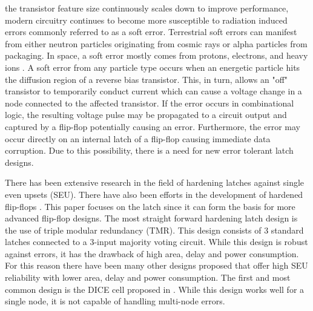
% 
 the transistor feature size continuously scales down to improve performance, modern circuitry continues to become more susceptible to radiation induced errors commonly referred to as a soft error. Terrestrial soft errors can manifest from either neutron particles originating from cosmic rays or alpha particles from packaging. In space, a soft error mostly comes from protons, electrons, and heavy ions \cite{Zick2008, Schwank2013}. A soft error from any particle type occurs when an energetic particle hits the diffusion region of a reverse bias transistor. This, in turn, allows an "off" transistor to temporarily conduct current which can cause a voltage change in a node connected to the affected transistor. If the error occurs in combinational logic, the resulting voltage pulse may be propagated to a circuit output and captured by a flip-flop potentially causing an error. Furthermore, the error may occur directly on an internal latch of a flip-flop causing immediate data corruption. Due to this possibility, there is a need for new error tolerant latch designs.

There has been extensive research in the field of hardening latches against single even upsets (SEU). There have also been efforts in the development of hardened flip-flops \cite{Clark2015}. This paper focuses on the latch since it can form the basis for more advanced flip-flop designs. The most straight forward hardening latch design is the use of triple modular redundancy (TMR). This design consists of 3 standard latches connected to a 3-input majority voting circuit. While this design is robust against errors, it has the drawback of high area, delay and power consumption. For this reason there have been many other designs proposed that offer high SEU reliability with lower area, delay and power consumption. The first and most common design is the DICE cell proposed in \cite{DICE}. While this design works well for a single node, it is not capable of handling multi-node errors. 

